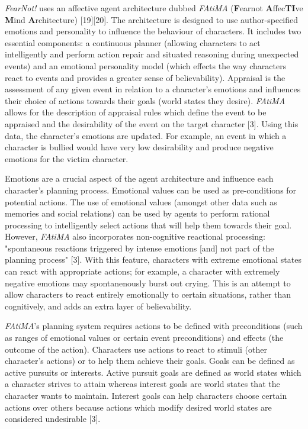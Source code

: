 \documentclass{sig-alternate-05-2015}
\begin{document}
\textit{FearNot!} uses an affective agent architecture dubbed \textit{FAtiMA} (\textbf{F}earnot \textbf{A}ffec\textbf{TI}ve \textbf{M}ind \textbf{A}rchitecture) [19][20]. The architecture is designed to use author-specified emotions and personality to influence the behaviour of characters. It includes two essential components: a continuous planner (allowing characters to act intelligently and perform action repair and situated reasoning during unexpected events) and an emotional personality model (which effects the way characters react to events and provides a greater sense of believability). Appraisal is the assessment of any given event in relation to a character's emotions and influences their choice of actions towards their goals (world states they desire). \textit{FAtiMA} allows for the description of appraisal rules which define the event to be appraised and the desirability of the event on the target character [3]. Using this data, the character's emotions are updated. For example, an event in which a character is bullied would have very low desirability and produce negative emotions for the victim character.

Emotions are a crucial aspect of the agent architecture and influence each character's planning process. Emotional values can be used as pre-conditions for potential actions. The use of emotional values (amongst other data such as memories and social relations) can be used by agents to perform rational processing to intelligently select actions that will help them towards their goal. However, \textit{FAtiMA} also incorporates non-cognitive reactional processing: "spontaneous reactions triggered by intense emotions [and] not part of the planning process" [3]. With this feature, characters with extreme emotional states can react with appropriate actions; for example, a character with extremely negative emotions may spontanenously burst out crying. This is an attempt to allow characters to react entirely emotionally to certain situations, rather than cognitively, and adds an extra layer of believability.

\textit{FAtiMA}'s planning system requires actions to be defined with preconditions (such as ranges of emotional values or certain event preconditions) and effects (the outcome of the action). Characters use actions to react to stimuli (other character's actions) or to help them achieve their goals. Goals can be defined as active pursuits or interests. Active pursuit goals are defined as world states which a character strives to attain whereas interest goals are world states that the character wants to maintain. Interest goals can help characters choose certain actions over others because actions which modify desired world states are considered undesirable [3].
\end{document}
